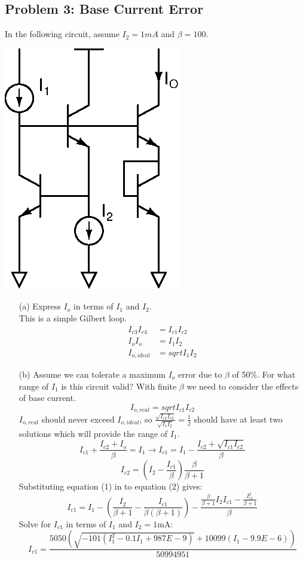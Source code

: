 \documentclass[11pt,twoside]{article}
\begin{document}
\subsection*{Problem 3: Base Current Error}
In the following circuit, assume $I_2=1mA$ and $\beta=100$.\\
\vspace{1ex}

\begin{center}
\includegraphics[width=.28\textwidth]{sqrtxy.eps}
\end{center}
\clearpage
\begin{enumerate}
	\item[(a)] Express $I_o$ in terms of $I_1$ and $I_2$.\\
 This is a simple Gilbert loop.
	\begin{align*}
	I_{c3}I_{c4}&=I_{c1}I_{c2}\\
	I_oI_o&=I_1I_2\\
	I_{o,ideal}&=sqrt{I_1I_2}
	\end{align*}
	\item[(b)] Assume we can tolerate a maximum $I_o$ error due to $\beta$ of 50\%.  For what range of $I_1$ is this circuit valid?
\vspace{1ex}
With finite $\beta$ we need to consider the effects of base current.
\begin{equation*}
I_{o,real} = sqrt{I_{c1}I_{c2}}
\end{equation*}
$I_{o,real}$ should never exceed $I_{o,ideal}$, so 
$\frac{\sqrt{I_{c1}I_{c2}}}{\sqrt{I_1I_2}}=\frac{1}{2}$ should have at least two solutions
which will provide the range of $I_1$.
\begin{equation}
I_{c1}+\frac{I_{c2}+I_o}{\beta}=I_1 \rightarrow 
I_{c1}=I_1-\frac{I_{c2}+\sqrt{I_{c1}I_{c2}}}{\beta}
\end{equation}
\begin{equation}
I_{c2} = (I_2-\frac{I_{c1}}{\beta})\frac{\beta}{\beta+1}
\end{equation}
Substituting equation (1) in to equation (2) gives:
\begin{equation*}
I_{c1}=I_1-(\frac{I_2}{\beta+1}-\frac{I_{c1}}{\beta(\beta+1)})-
\frac{\frac{\beta}{\beta+1}I_2I_{c1}-\frac{I_{c1}^2}{\beta+1}}{\beta}
\end{equation*}
Solve for $I_{c1}$ in terms of $I_1$ and $I_2=1$mA:
\begin{equation*}
I_{c1}=\frac{5050(\sqrt{-101(I_1^2-0.1I_1+987E-9)}+10099(I_1-9.9E-6))}{50994951}
\end{equation*}
\end{enumerate}
\end{document}
